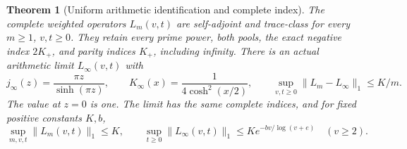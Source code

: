 \documentclass[11pt]{article}
\newtheorem{theorem}{Theorem}
\theoremstyle{remark}\newtheorem{remark}[theorem]{Remark}
\begin{document}
\begin{theorem}[Uniform arithmetic identification and complete index]
\label{thm:growing-resolvent-limit}
The complete weighted operators \(L_m(v,t)\) are self-adjoint
and trace-class for every \(m\ge1\), \(v,t\ge0\).
They retain every prime power, both pools, the exact negative
index \(2K_+\), and parity indices \(K_+\), including infinity.
There is an actual arithmetic limit \(L_\infty(v,t)\) with
\[
 j_\infty(z)=\frac{\pi z}{\sinh(\pi z)},\qquad
 K_\infty(x)=\frac1{4\cosh^2(x/2)},\qquad
 \sup_{v,t\ge0}\|L_m-L_\infty\|_1\le K/m.            \tag{GL2}
\]
The value at \(z=0\) is one. The limit has the same complete
indices, and for fixed positive constants \(K,b\),
\[
 \sup_{m,v,t}\|L_m(v,t)\|_1\le K,\qquad
 \sup_{t\ge0}\|L_\infty(v,t)\|_1
          \le Ke^{-b v/\log(v+e)}\quad(v\ge2).         \tag{GL3}
\]
\end{theorem}
\end{document}
